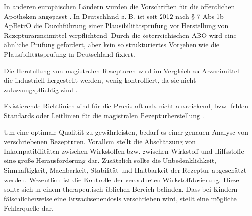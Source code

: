 \documentclass[12pt,a4paper]{article}
\begin{document}
In anderen europäischen Ländern wurden die Vorschriften für die öffentlichen Apotheken angepasst \cite{Holzer.2019}. %
In Deutschland z. B. ist seit 2012 nach § 7 Abs 1b ApBetrO die Durchführung einer Plausibilitätsprüfung vor Herstellung von Rezepturarzneimittel verpflichtend. Durch die österreichischen \ac{ABO} wird eine ähnliche Prüfung gefordert, aber kein so strukturiertes Vorgehen wie die Plausibilitätsprüfung in Deutschland fixiert. 




Die Herstellung von magistralen Rezepturen wird im Vergleich zu Arzneimittel die industriell hergestellt werden, wenig kontrolliert, da sie nicht zulassungspflichtig sind \cite{Holzer.2019}.%

Existierende Richtlinien sind für die Praxis oftmals nicht ausreichend,  %
bzw. fehlen Standards oder Leitlinien für die magistralen Rezepturherstellung \cite{.11.11.2019,Holzer.2019}.%

Um eine optimale  Qualität zu gewährleisten,  bedarf es einer genauen Analyse von verschriebenen Rezepturen. Vorallem stellt die Abschätzung von Inkompatibilitäten zwischen Wirkstoffen bzw. zwischen Wirkstoff und Hilfsstoffe eine große Herausforderung dar. Zusätzlich sollte die Unbedenklichkeit, Sinnhaftigkeit, Machbarkeit, Stabilität und Haltbarkeit der Rezeptur abgeschätzt werden. 
Wesentlich ist die Kontrolle der verordneten Wirkstoffdosierung. Diese sollte sich in einem therapeutisch üblichen Bereich befinden. Dass bei Kindern fälschlicherweise eine Erwachsenendosis verschrieben wird, stellt eine mögliche Fehlerquelle dar.
\end{document}
